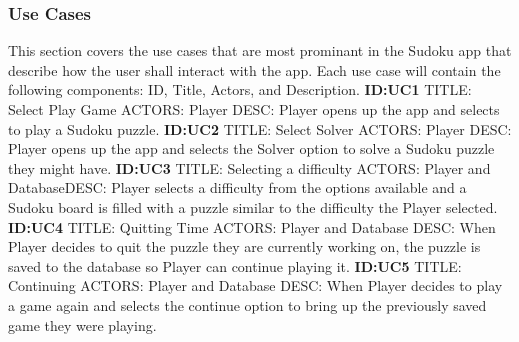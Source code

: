 \documentclass{article}
\begin{document}
\subsubsection{Use Cases}
This section covers the use cases that are most prominant in the Sudoku app that describe how the user shall interact with the app. Each use case will contain the following components: ID, Title, Actors, and Description.\newline \newline
\textbf{ID:UC1} \newline TITLE: Select Play Game \newline ACTORS: Player \newline DESC: Player opens up the app and selects to play a Sudoku puzzle. \newline \newline
\textbf{ID:UC2} \newline TITLE: Select Solver \newline ACTORS: Player \newline DESC: Player opens up the app and selects the Solver option to solve a Sudoku puzzle they might have. \newline \newline
\textbf{ID:UC3} \newline TITLE: Selecting a difficulty \newline ACTORS: Player and Database\newline DESC: Player selects a difficulty from the options available and a Sudoku board is filled with a puzzle similar to the difficulty the Player selected. \newline \newline
\textbf{ID:UC4} \newline TITLE: Quitting Time \newline ACTORS: Player and Database \newline DESC: When Player decides to quit the puzzle they are currently working on, the puzzle is saved to the database so Player can continue playing it.  \newline \newline
\textbf{ID:UC5} \newline TITLE: Continuing \newline ACTORS: Player and Database \newline DESC: When Player decides to play a game again and selects the continue option to bring up the previously saved game they were playing. \newline \newline
\end{document}
